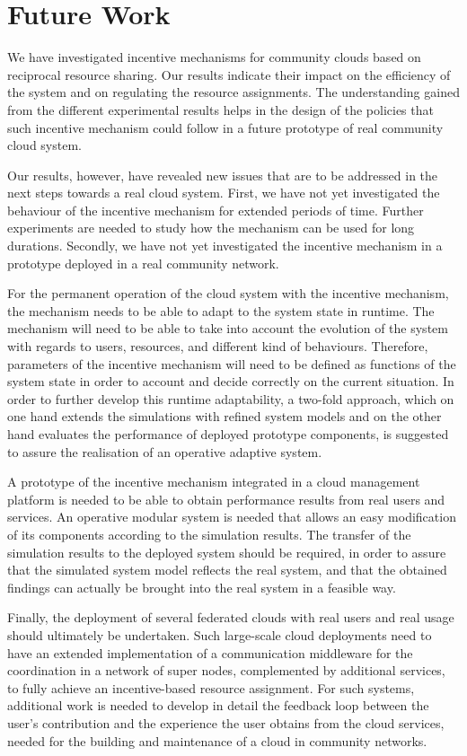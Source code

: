 

\section{Future Work}
\label{sec:future_work}

We have investigated incentive mechanisms for community clouds based on reciprocal resource sharing. 
Our results indicate their impact on the efficiency of the system and on regulating the resource assignments. 
The understanding gained from the different experimental results helps in the design of the policies that such incentive mechanism could follow in a future prototype of real community cloud system. 

Our results, however, have revealed new issues that are to be addressed in the next steps towards a real cloud system. 
First, we have not yet investigated the behaviour of the incentive mechanism for extended periods of time. 
Further experiments are needed to study how the mechanism can be used for long durations.
Secondly, we have not yet investigated the incentive mechanism in a prototype deployed in a real community network.

For the permanent operation of the cloud system with the incentive mechanism, the mechanism needs to be able to adapt to the system state in runtime. 
The mechanism will need to be able to take into account the evolution of the system with regards to users, resources, and different kind of behaviours. 
Therefore, parameters of the incentive mechanism will need to be defined as functions of the system state in order to account and decide correctly on the current situation. 
In order to further develop this runtime adaptability, a two-fold approach, which on one hand extends the simulations with refined system models and on the other hand evaluates the performance of deployed prototype components, is suggested to assure the realisation of an operative adaptive system.  

A prototype of the incentive mechanism integrated in a cloud management platform is needed to be able to obtain performance results from real users and services. 
An operative modular system is needed that allows an easy modification of its components according to the simulation results. 
The transfer of the simulation results to the deployed system should be required, in order to assure that the simulated system model reflects the real system, and that the obtained findings can actually be brought into the real system in a feasible way.      

Finally, the deployment of several federated clouds with real users and real usage should ultimately be undertaken. 
Such large-scale cloud deployments need to have an extended implementation of a communication middleware for the coordination in a network of super nodes, complemented by additional services, to fully achieve an incentive-based resource assignment. 
For such systems, additional work is needed to develop in detail the feedback loop between the user's contribution and the experience the user obtains from the cloud services, needed for the building and maintenance of a cloud in community networks. 
